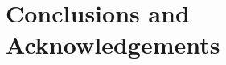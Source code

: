 \documentclass[twocolumn]{Styles/IEEEtran11}
\begin{document}
\section{Conclusions and Acknowledgements}







\end{document}
